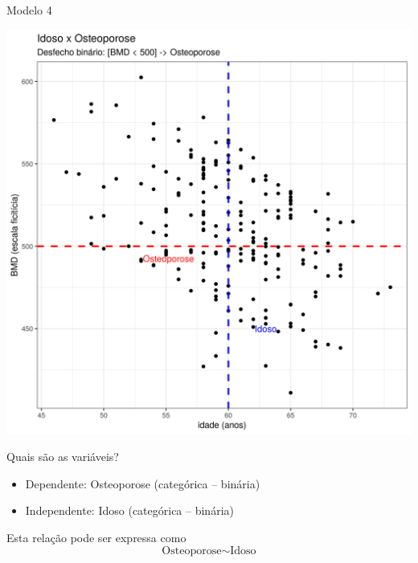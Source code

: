 \documentclass{beamer}
\begin{document}
\begin{frame}{\scriptsize Modelo 4}
  \begin{center}
    \includegraphics[height=.9\textheight]{Cap31-32/pratica-glm4}
  \end{center}
\end{frame}

\begin{frame}{\scriptsize Quais são as variáveis?}
  \begin{itemize}
    \footnotesize
  \item \alert{Dependente: Osteoporose (categórica -- binária)}
  \item Independente: Idoso (categórica -- binária)
  \end{itemize}
  \vfill
  \begin{block}{Esta relação pode ser expressa como}
    \footnotesize
    \begin{displaymath}
      \text{Osteoporose} \sim \text{Idoso}
    \end{displaymath}
  \end{block}
\end{frame}
\end{document}
